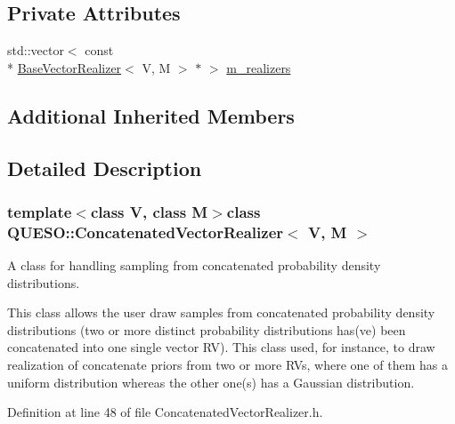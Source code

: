 \subsection*{Private Attributes}
\begin{DoxyCompactItemize}
\item 
std\-::vector$<$ const \\*
\hyperlink{class_q_u_e_s_o_1_1_base_vector_realizer}{Base\-Vector\-Realizer}$<$ V, M $>$ $\ast$ $>$ \hyperlink{class_q_u_e_s_o_1_1_concatenated_vector_realizer_a1be059d72ef9d1296928d345774e89c7}{m\-\_\-realizers}
\end{DoxyCompactItemize}
\subsection*{Additional Inherited Members}


\subsection{Detailed Description}
\subsubsection*{template$<$class V, class M$>$class Q\-U\-E\-S\-O\-::\-Concatenated\-Vector\-Realizer$<$ V, M $>$}

A class for handling sampling from concatenated probability density distributions. 

This class allows the user draw samples from concatenated probability density distributions (two or more distinct probability distributions has(ve) been concatenated into one single vector R\-V). This class used, for instance, to draw realization of concatenate priors from two or more R\-Vs, where one of them has a uniform distribution whereas the other one(s) has a Gaussian distribution. 

Definition at line 48 of file Concatenated\-Vector\-Realizer.\-h.




